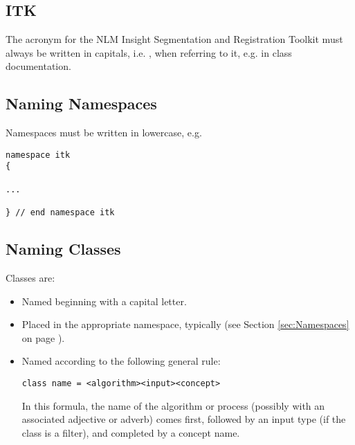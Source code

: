\subsection{ITK}
\label{subsec:ITK}

The acronym for the NLM Insight Segmentation and Registration Toolkit must
always be written in capitals, i.e. , when referring to it, e.g. in
class documentation.


\subsection{Naming Namespaces}
\label{subsec:NamingNamespaces}

Namespaces must be written in lowercase, e.g.

\small
\begin{verbatim}
namespace itk
{

...

} // end namespace itk
\end{verbatim}
\normalsize


\subsection{Naming Classes}
\label{subsec:NamingClasses}

Classes are:
\begin{itemize}
\item Named beginning with a capital letter.
\item Placed in the appropriate namespace, typically  (see
Section \ref{sec:Namespaces} on page \pageref{sec:Namespaces}).
\item Named according to the following general rule:
\small
\begin{verbatim}
class name = <algorithm><input><concept>
\end{verbatim}
\normalsize

In this formula, the name of the algorithm or process (possibly with an
associated adjective or adverb) comes first, followed by an input type (if the
class is a filter), and completed by a concept name.
\end{itemize}

